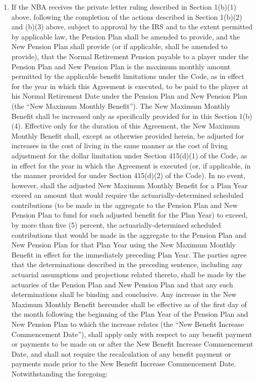 \documentclass[
]{book}
\begin{document}
\begin{enumerate}
\begin{enumerate}
  \item
    If the NBA receives the private letter ruling described in Section 1(b)(1) above, following the completion of the actions described in Section 1(b)(2) and (b)(3) above, subject to approval by the IRS and to the extent permitted by applicable law, the Pension Plan shall be amended to provide, and the New Pension Plan shall provide (or if applicable, shall be amended to provide), that the Normal Retirement Pension payable to a player under the Pension Plan and New Pension Plan is the maximum monthly amount permitted by the applicable benefit limitations under the Code, as in effect for the year in which this Agreement is executed, to be paid to the player at his Normal Retirement Date under the Pension Plan and New Pension Plan (the ``New Maximum Monthly Benefit''). The New Maximum Monthly Benefit shall be increased only as specifically provided for in this Section 1(b)(4).
    Effective only for the duration of this Agreement, the New Maximum Monthly Benefit shall, except as otherwise provided herein, be adjusted for increases in the cost of living in the same manner as the cost of living adjustment for the dollar limitation under Section 415(d)(1) of the Code, as in effect for the year in which the Agreement is executed (or, if applicable, in the manner provided for under Section 415(d)(2) of the Code). In no event, however, shall the adjusted New Maximum Monthly Benefit for a Plan Year exceed an amount that would require the actuarially-determined scheduled contributions (to be made in the aggregate to the Pension Plan and New Pension Plan to fund for such adjusted benefit for the Plan Year) to exceed, by more than five (5) percent, the actuarially-determined scheduled contributions that would be made in the aggregate to the Pension Plan and New Pension Plan for that Plan Year using the New Maximum Monthly Benefit in effect for the immediately preceding Plan Year. The parties agree that the determinations described in the preceding sentence, including any actuarial assumptions and projections related thereto, shall be made by the actuaries of the Pension Plan and New Pension Plan and that any such determinations shall be binding and conclusive. Any increase in the New Maximum Monthly Benefit hereunder shall be effective as of the first day of the month following the beginning of the Plan Year of the Pension Plan and New Pension Plan to which the increase relates (the ``New Benefit Increase Commencement Date''), shall apply only with respect to any benefit payment or payments to be made on or after the New Benefit Increase Commencement Date, and shall not require the recalculation of any benefit payment or payments made prior to the New Benefit Increase Commencement Date.
    Notwithstanding the foregoing:


\end{enumerate}
\end{enumerate}
\end{document}
